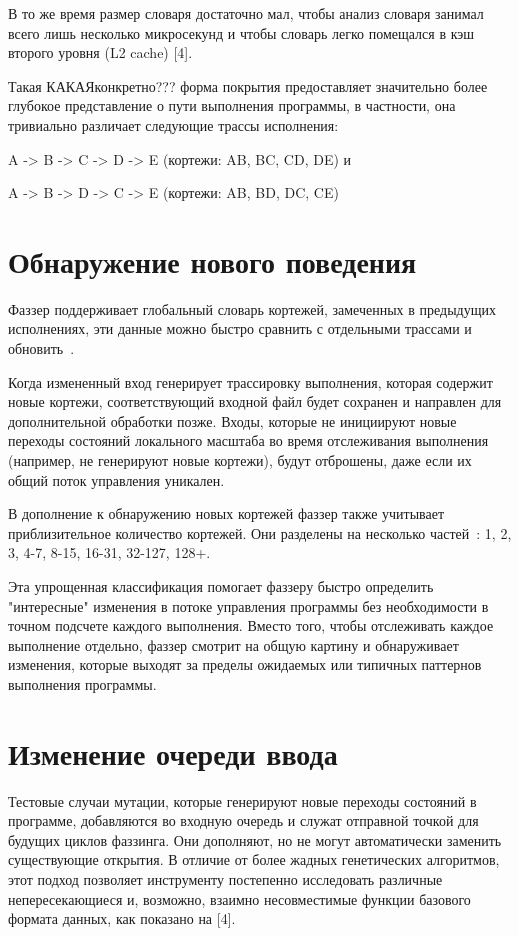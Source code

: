 В то же время размер словаря достаточно мал, чтобы анализ словаря занимал всего лишь несколько микросекунд и чтобы словарь легко помещался в кэш второго уровня (L2 cache) [4].
\par
Такая КАКАЯконкретно??? форма покрытия предоставляет значительно более глубокое представление о пути выполнения программы, в частности, она тривиально различает следующие трассы исполнения:
\par
A -> B -> C -> D -> E (кортежи: AB, BC, CD, DE) и 
\par
A -> B -> D -> C -> E (кортежи: AB, BD, DC, CE)

\section{Обнаружение нового поведения} \label{ch3:sec3}
Фаззер поддерживает глобальный словарь кортежей, замеченных в предыдущих исполнениях, эти данные можно быстро сравнить с отдельными трассами и обновить~\cite{???}.
\par
Когда измененный вход генерирует трассировку выполнения, которая содержит новые кортежи, соответствующий входной файл будет сохранен и направлен для дополнительной обработки позже. Входы, которые не инициируют новые переходы состояний локального масштаба во время отслеживания выполнения (например, не генерируют новые кортежи), будут отброшены, даже если их общий поток управления уникален.
\par
В дополнение к обнаружению новых кортежей фаззер также учитывает приблизительное количество кортежей. Они разделены на несколько частей~\cite{???}:
1, 2, 3, 4-7, 8-15, 16-31, 32-127, 128+.
\par
Эта упрощенная классификация помогает фаззеру быстро определить "интересные" изменения в потоке управления программы без необходимости в точном подсчете каждого выполнения. Вместо того, чтобы отслеживать каждое выполнение отдельно, фаззер смотрит на общую картину и обнаруживает изменения, которые выходят за пределы ожидаемых или типичных паттернов выполнения программы.

\section{Изменение очереди ввода} \label{ch3:sec4}
Тестовые случаи мутации, которые генерируют новые переходы состояний в программе, добавляются во входную очередь и служат отправной точкой для будущих циклов фаззинга. Они дополняют, но не могут автоматически заменить существующие открытия.
В отличие от более жадных генетических алгоритмов, этот подход позволяет инструменту постепенно исследовать различные непересекающиеся и, возможно, взаимно несовместимые функции базового формата данных, как показано на  [4].

